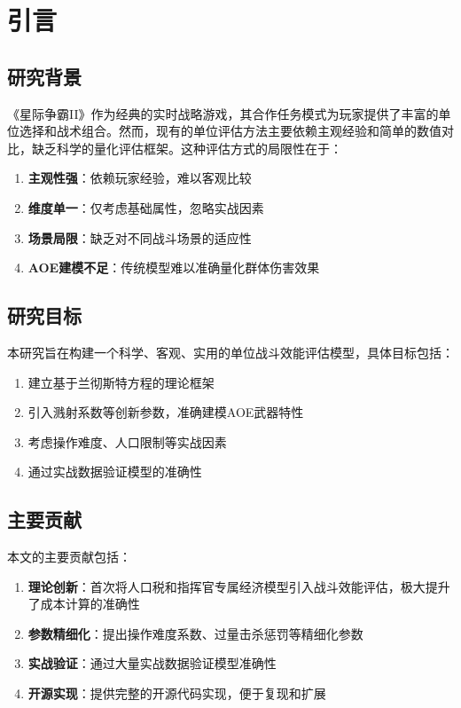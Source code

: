 \documentclass[a4paper,12pt]{article}
\begin{document}
\pagestyle{fancy}
\fancyhf{}
\lhead{\leftmark}
\rhead{\thepage}
\renewcommand{\headrulewidth}{0.4pt}

\section{引言}

\subsection{研究背景}

《星际争霸II》作为经典的实时战略游戏，其合作任务模式为玩家提供了丰富的单位选择和战术组合。然而，现有的单位评估方法主要依赖主观经验和简单的数值对比，缺乏科学的量化评估框架。这种评估方式的局限性在于：

\begin{enumerate}
    \item \textbf{主观性强}：依赖玩家经验，难以客观比较
    \item \textbf{维度单一}：仅考虑基础属性，忽略实战因素
    \item \textbf{场景局限}：缺乏对不同战斗场景的适应性
    \item \textbf{AOE建模不足}：传统模型难以准确量化群体伤害效果
\end{enumerate}

\subsection{研究目标}

本研究旨在构建一个科学、客观、实用的单位战斗效能评估模型，具体目标包括：

\begin{enumerate}
    \item 建立基于兰彻斯特方程的理论框架
    \item 引入溅射系数等创新参数，准确建模AOE武器特性
    \item 考虑操作难度、人口限制等实战因素
    \item 通过实战数据验证模型的准确性
\end{enumerate}

\subsection{主要贡献}

本文的主要贡献包括：

\begin{enumerate}
    \item \textbf{理论创新}：首次将人口税和指挥官专属经济模型引入战斗效能评估，极大提升了成本计算的准确性
    \item \textbf{参数精细化}：提出操作难度系数、过量击杀惩罚等精细化参数
    \item \textbf{实战验证}：通过大量实战数据验证模型准确性
    \item \textbf{开源实现}：提供完整的开源代码实现，便于复现和扩展
\end{enumerate}
\end{document}
